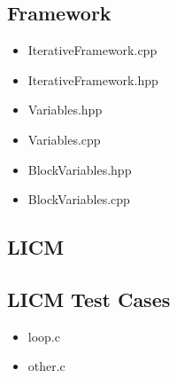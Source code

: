 \subsection{Framework}

\begin{itemize}
   \item IterativeFramework.cpp

   {\tiny }

   \item IterativeFramework.hpp

   {\tiny }

   \item Variables.hpp

   {\tiny }

   \item Variables.cpp

   {\tiny }

   \item BlockVariables.hpp

   {\tiny }

   \item BlockVariables.cpp

   {\tiny }

\end{itemize}

\subsection{LICM}

{\tiny }

\subsection{LICM Test Cases}

\begin{itemize}
   \item loop.c

   {\tiny }

   \item other.c

   {\tiny }
\end{itemize}
